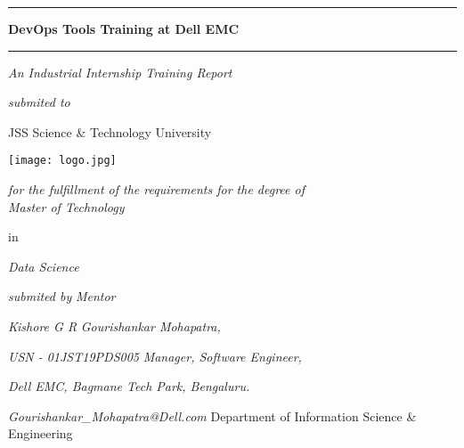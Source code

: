 %
\begin{titlepage}
	\begin{center}
	\hfill
	
   
	\rule[5pt]{\textwidth}{1.0pt} \par
{\Huge \textbf{DevOps Tools Training at Dell EMC} \par}
\rule[5pt]{\textwidth}{1.0pt} \par

	\vspace*{1cm}
	{\large {}\centering\textit{An Industrial Internship Training Report}\par \vspace*{1cm}
	\textit{submited to}\par
		{\Large JSS Science \& Technology University} \par  
		{\texttt{[image: logo.jpg]}} \par
		{\textit{for the fulfillment of the requirements for the degree of \\ Master of Technology}\par in \par\textit{Data Science} \par	\vspace*{1cm}
			\vspace*{2cm}
			\textit{submited by} \hfill \textit{Mentor}\par
			\vspace*{0.5cm}
			\textit{Kishore G R} \hfill \textit{Gourishankar Mohapatra,}\par
			\textit{USN - 01JST19PDS005} \hfill \textit{Manager, Software Engineer,}\par
			\hfill \textit{Dell EMC, Bagmane Tech Park, Bengaluru.}\par
            \hfill \textit{Gourishankar\_Mohapatra@Dell.com}
	    \vfill
	    \large{} {Department of Information Science \& Engineering}\par
		\small {}} 

	\vfill
}
	\end{center}
\end{titlepage}




